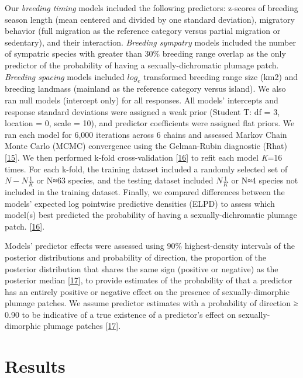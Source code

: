 \documentclass[
  a4paper,
]{article}
\begin{document}
Our \emph{breeding timing} models included the following predictors:
z-scores of breeding season length (mean centered and divided by one
standard deviation), migratory behavior (full migration as the reference
category versus partial migration or sedentary), and their interaction.
\emph{Breeding sympatry} models included the number of sympatric species
with greater than 30\% breeding range overlap as the only predictor of
the probability of having a sexually-dichromatic plumage patch.
\emph{Breeding spacing} models included \(log_{e}\) transformed breeding
range size (km2) and breeding landmass (mainland as the reference
category versus island). We also ran null models (intercept only) for
all responses. All models' intercepts and response standard deviations
were assigned a weak prior (Student T: df = 3, location = 0, scale =
10), and predictor coefficients were assigned flat priors. We ran each
model for 6,000 iterations across 6 chains and assessed Markov Chain
Monte Carlo (MCMC) convergence using the Gelman-Rubin diagnostic (Rhat)
{[}\protect\hyperlink{ref-gelman2013}{15}{]}. We then performed k-fold
cross-validation {[}\protect\hyperlink{ref-vehtari2017}{16}{]} to refit
each model \emph{K}=16 times. For each k-fold, the training dataset
included a randomly selected set of \(N- N\frac{1}{K}\) or N≈63 species,
and the testing dataset included \(N\frac{1}{K}\) or N≈4 species not
included in the training dataset. Finally, we compared differences
between the models' expected log pointwise predictive densities (ELPD)
to assess which model(s) best predicted the probability of having a
sexually-dichromatic plumage patch.
{[}\protect\hyperlink{ref-vehtari2017}{16}{]}⁠.

Models' predictor effects were assessed using 90\% highest-density
intervals of the posterior distributions and probability of direction,
the proportion of the posterior distribution that shares the same sign
(positive or negative) as the posterior median
{[}\protect\hyperlink{ref-makowski2019}{17}{]}, to provide estimates of
the probability of that a predictor has an entirely positive or negative
effect on the presence of sexually-dimorphic plumage patches. We assume
predictor estimates with a probability of direction ≥ 0.90 to be
indicative of a true existence of a predictor's effect on
sexually-dimorphic plumage patches
{[}\protect\hyperlink{ref-makowski2019}{17}{]}.

\hypertarget{results}{%
\section{Results}\label{results}}
\end{document}
